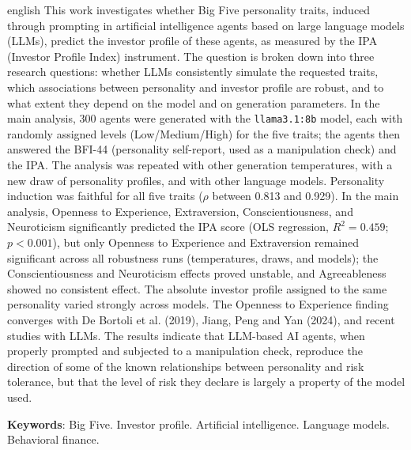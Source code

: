     \begin{otherlanguage*}{english}
        This work investigates whether Big Five personality traits, induced
        through prompting in artificial intelligence agents based on large
        language models (LLMs), predict the investor profile of these
        agents, as measured by the IPA (Investor Profile Index) instrument.
        The question is broken down into three research questions: whether
        LLMs consistently simulate the requested traits, which associations
        between personality and investor profile are robust, and to what
        extent they depend on the model and on generation parameters. In
        the main analysis, 300 agents were generated with the
        \texttt{llama3.1:8b} model, each with randomly assigned levels
        (Low/Medium/High) for the five traits; the agents then answered the
        BFI-44 (personality self-report, used as a manipulation check) and
        the IPA. The analysis was repeated with other generation
        temperatures, with a new draw of personality profiles, and with
        other language models. Personality induction was faithful for all
        five traits ($\rho$ between 0.813 and 0.929). In the main analysis,
        Openness to Experience, Extraversion, Conscientiousness, and
        Neuroticism significantly predicted the IPA score (OLS regression,
        $R^2=0.459$; $p<0.001$), but only Openness to Experience and
        Extraversion remained significant across all robustness runs
        (temperatures, draws, and models); the Conscientiousness and
        Neuroticism effects proved unstable, and Agreeableness showed no
        consistent effect. The absolute investor profile assigned to the
        same personality varied strongly across models. The Openness to
        Experience finding converges with De Bortoli et al. (2019), Jiang,
        Peng and Yan (2024), and recent studies with LLMs. The results
        indicate that LLM-based AI agents, when properly prompted and
        subjected to a manipulation check, reproduce the direction of some
        of the known relationships between personality and risk tolerance,
        but that the level of risk they declare is largely a property of
        the model used.

        \vspace{\baselineskip}

        \noindent
        \textbf{Keywords}: Big Five. Investor profile. Artificial
        intelligence. Language models. Behavioral finance.
    \end{otherlanguage*}

